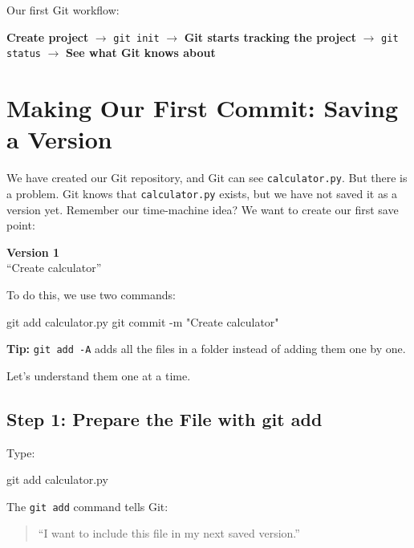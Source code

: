 \documentclass[11pt,a4paper]{article}
\begin{document}
Our first Git workflow:

\begin{center}
\textbf{Create project}
$\rightarrow$
\texttt{git init}
$\rightarrow$
\textbf{Git starts tracking the project}
$\rightarrow$
\texttt{git status}
$\rightarrow$
\textbf{See what Git knows about}
\end{center}

\section{Making Our First Commit: Saving a Version}

We have created our Git repository, and Git can see \texttt{calculator.py}. But there is a problem. Git knows that \texttt{calculator.py} exists, but we have not saved it as a version yet. Remember our time-machine idea?
We want to create our first save point:

\begin{center}
\textbf{Version 1}\\
``Create calculator''
\end{center}

To do this, we use two commands:

\begin{code}
git add calculator.py
git commit -m "Create calculator"
\end{code}

\textbf{Tip:} \texttt{git add -A} adds all the files in a folder instead of adding them one by one.

Let's understand them one at a time.





\subsection{Step 1: Prepare the File with git add}

Type:

\begin{code}
git add calculator.py
\end{code}

The \texttt{git add} command tells Git:

\begin{quote}
``I want to include this file in my next saved version.''
\end{quote}
\end{document}
